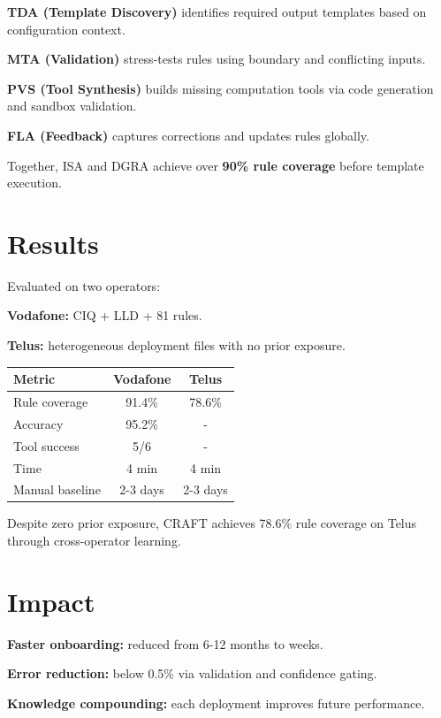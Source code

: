 \documentclass[10pt]{article}
\begin{document}
\textbf{TDA (Template Discovery)} identifies required output templates based on configuration context.

\textbf{MTA (Validation)} stress-tests rules using boundary and conflicting inputs.

\textbf{PVS (Tool Synthesis)} builds missing computation tools via code generation and sandbox validation.

\textbf{FLA (Feedback)} captures corrections and updates rules globally.

Together, ISA and DGRA achieve over \textbf{90\% rule coverage} before template execution.

\section{Results}

Evaluated on two operators:

\textbf{Vodafone:} CIQ + LLD + 81 rules.

\textbf{Telus:} heterogeneous deployment files with no prior exposure.

\vspace{2pt}
\begin{center}
\small
\renewcommand{\arraystretch}{1.2}
\begin{tabular}{lcc}
\toprule
Metric & Vodafone & Telus \\
\midrule
Rule coverage & 91.4\% & 78.6\% \\
Accuracy & 95.2\% & - \\
Tool success & 5/6 & - \\
Time & 4 min & 4 min \\
Manual baseline & 2-3 days & 2-3 days \\
\bottomrule
\end{tabular}
\end{center}
\vspace{2pt}

Despite zero prior exposure, CRAFT achieves 78.6\% rule coverage on Telus through cross-operator learning.

\section{Impact}

\textbf{Faster onboarding:} reduced from 6-12 months to weeks.

\textbf{Error reduction:} below 0.5\% via validation and confidence gating.

\textbf{Knowledge compounding:} each deployment improves future performance.
\end{document}

